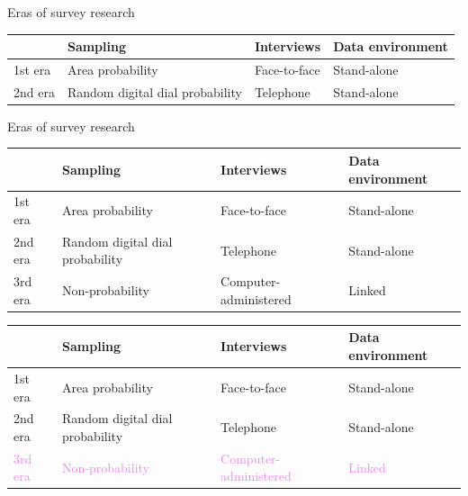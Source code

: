 \documentclass[aspectratio=169]{beamer}
\begin{document}
\begin{frame}{Eras of survey research}

\begin{center}
\renewcommand{\arraystretch}{1.5}
\begin{tabular}{p{}p{}p{}p{}}
& \textbf{Sampling} & \textbf{Interviews} & \textbf{Data environment}\\
\hline \hline
1st era & Area probability & Face-to-face & Stand-alone \\
\hline
2nd era & Random digital dial probability & Telephone & Stand-alone \\
\end{tabular}
\end{center}


\end{frame}
\begin{frame}{Eras of survey research}

\begin{center}
\renewcommand{\arraystretch}{1.5}
\begin{tabular}{p{}p{}p{}p{}}
& \textbf{Sampling} & \textbf{Interviews} & \textbf{Data environment}\\
\hline \hline
1st era & Area probability & Face-to-face & Stand-alone \\
\hline
2nd era & Random digital dial probability & Telephone & Stand-alone \\
\hline
3rd era & Non-probability & Computer-administered  & Linked \\
\end{tabular}
\end{center}

\end{frame}
\begin{frame}
\begin{center}
\renewcommand{\arraystretch}{1.5}
\begin{tabular}{p{}p{}p{}p{}}
& \textbf{Sampling} & \textbf{Interviews} & \textbf{Data environment}\\
\hline \hline
1st era & Area probability & Face-to-face & Stand-alone \\
\hline
2nd era & Random digital dial probability & Telephone & Stand-alone \\
\hline
\textcolor{violet}{3rd era} & \textcolor{violet}{Non-probability} & \textcolor{violet}{Computer-administered}  & \textcolor{violet}{Linked} \\
\end{tabular}
\end{center}

\end{frame}
\end{document}
